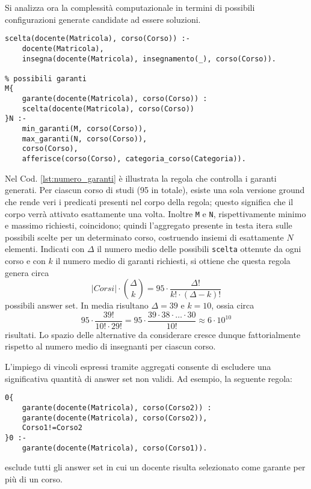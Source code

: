 Si analizza ora la complessità computazionale in termini di
possibili configurazioni generate candidate ad essere soluzioni.

\begin{lstlisting}[style=asp, caption={Frammento del file \texttt{main.lp}.}, label={lst:numero_garanti}]
scelta(docente(Matricola), corso(Corso)) :-
	docente(Matricola),
	insegna(docente(Matricola), insegnamento(_), corso(Corso)).

% possibili garanti
M{
	garante(docente(Matricola), corso(Corso)) :
	scelta(docente(Matricola), corso(Corso))
}N :-
	min_garanti(M, corso(Corso)),
	max_garanti(N, corso(Corso)),
	corso(Corso),
	afferisce(corso(Corso), categoria_corso(Categoria)).
\end{lstlisting}
Nel Cod. \ref{lst:numero_garanti} è illustrata la regola che controlla i garanti
generati. Per ciascun corso di studi (95 in totale), esiste una sola versione ground che rende veri i
predicati presenti nel corpo della regola; questo significa che il corpo verrà
attivato esattamente una volta. Inoltre \texttt{M} e \texttt{N},
rispettivamente minimo e massimo richiesti, coincidono; quindi l'aggregato
presente in testa itera sulle possibili scelte per un determinato corso,
costruendo insiemi di esattamente $N$ elementi. Indicati con $\Delta$ il numero
medio delle possibili \texttt{scelta} ottenute da ogni corso e con $k$ il numero medio di garanti richiesti, si ottiene che questa regola genera circa
\[
	|\mathit{Corsi}| \cdot \binom{\Delta}{k}
	= 95 \cdot \frac{\Delta !}{k! \cdot (\Delta - k)!}
\]
possibili answer set. In media risultano $\Delta = 39 \text{ e } k=10$, ossia
circa  
\[
	95 \cdot \frac{39!}{10! \cdot 29!} = 95 \cdot \frac{39 \cdot 38 \cdot \ldots \cdot 30}{10!}
	\approx
	6 \cdot 10^{10}
\]
risultati. Lo spazio delle alternative da considerare cresce dunque fattorialmente rispetto al
numero medio di insegnanti per ciascun corso.

L’impiego di vincoli espressi tramite aggregati consente di escludere una
significativa quantità di answer set non validi. Ad esempio, la seguente regola:
\begin{lstlisting}[style=asp, caption={Frammento del file \texttt{main.lp}.}, label={lst:max_volte_garante}]
% un docente e' scelto al piu' una volta
0{
	garante(docente(Matricola), corso(Corso2)) :
	garante(docente(Matricola), corso(Corso2)),
	Corso1!=Corso2
}0 :-
	garante(docente(Matricola), corso(Corso1)).
\end{lstlisting}
esclude tutti gli answer set in cui un docente risulta selezionato come garante
per più di un corso. 

